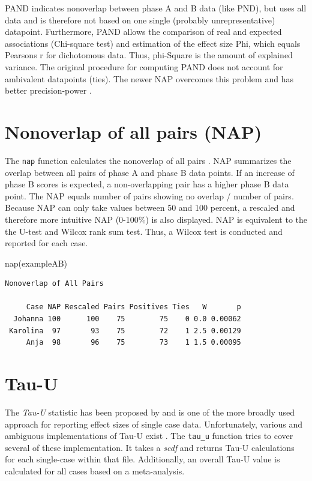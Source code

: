 \documentclass[
]{book}
\newenvironment{Shaded}{\begin{snugshade}}{\end{snugshade}}
\newcommand{\FunctionTok}[1]{\textcolor[rgb]{0.00,0.00,0.00}{#1}}
\newcommand{\NormalTok}[1]{#1}
\begin{document}
PAND indicates nonoverlap between phase A and B data (like PND), but uses all data and is therefore not based on one single (probably unrepresentative) datapoint. Furthermore, PAND allows the comparison of real and expected associations (Chi-square test) and estimation of the effect size Phi, which equals Pearsons r for dichotomous data. Thus, phi-Square is the amount of explained variance. The original procedure for computing PAND does not account for ambivalent datapoints (ties). The newer NAP overcomes this problem and has better precision-power \citep{parker_effect_2011}.

\hypertarget{nonoverlap-of-all-pairs-nap}{%
\section{Nonoverlap of all pairs (NAP)}\label{nonoverlap-of-all-pairs-nap}}

The \texttt{nap} function calculates the nonoverlap of all pairs \citep{parker_improved_2009}. NAP summarizes the overlap between all pairs of phase A and phase B data points. If an increase of phase B scores is expected, a non-overlapping pair has a higher phase B data point. The NAP equals number of pairs showing no overlap / number of pairs. Because NAP can only take values between 50 and 100 percent, a rescaled and therefore more intuitive NAP (0-100\%) is also displayed. NAP is equivalent to the the U-test and Wilcox rank sum test. Thus, a Wilcox test is conducted and reported for each case.

\begin{Shaded}
\begin{Highlighting}[]
\FunctionTok{nap}\NormalTok{(exampleAB)}
\end{Highlighting}
\end{Shaded}

\begin{verbatim}
Nonoverlap of All Pairs

     Case NAP Rescaled Pairs Positives Ties   W       p
  Johanna 100      100    75        75    0 0.0 0.00062
 Karolina  97       93    75        72    1 2.5 0.00129
     Anja  98       96    75        73    1 1.5 0.00095
\end{verbatim}

\hypertarget{tau-u}{%
\section{Tau-U}\label{tau-u}}

The \emph{Tau-U} statistic has been proposed by \citet{parker_combining_2011} and is one of the more broadly used approach for reporting effect sizes of single case data. Unfortunately, various and ambiguous implementations of Tau-U exist \citep{pustejovsky2016, brossart2018a}. The \texttt{tau\_u} function tries to cover several of these implementation. It takes a \emph{scdf} and returns Tau-U calculations for each single-case within that file. Additionally, an overall Tau-U value is calculated for all cases based on a meta-analysis.
\end{document}
